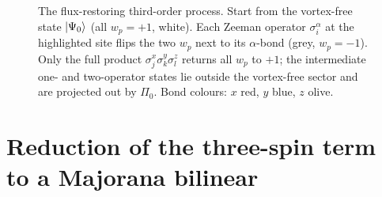\documentclass[
  aps,
  prl,
  preprint,
  amsmath,
  amssymb,
  superscriptaddress,
  floatfix
]{revtex4-2}
\begin{document}
\begin{figure}[H]
\caption{The flux-restoring third-order process. Start from the vortex-free
  state $\ket{\Psi_0}$ (all $w_p=+1$, white). Each Zeeman operator
  $\sigma_i^\alpha$ at the highlighted site flips the two $w_p$ next to its
  $\alpha$-bond (grey, $w_p=-1$). Only the full product
  $\sigma_j^x\sigma_k^y\sigma_l^z$ returns all $w_p$ to $+1$; the
  intermediate one- and two-operator states lie outside the vortex-free
  sector and are projected out by $\Pi_0$. Bond colours: $x$ red, $y$ blue,
  $z$ olive.}
\label{fig:sm_flux_flip}
\end{figure}

\section{Reduction of the three-spin term to a Majorana bilinear}
\label{sm:nnn}
\end{document}
